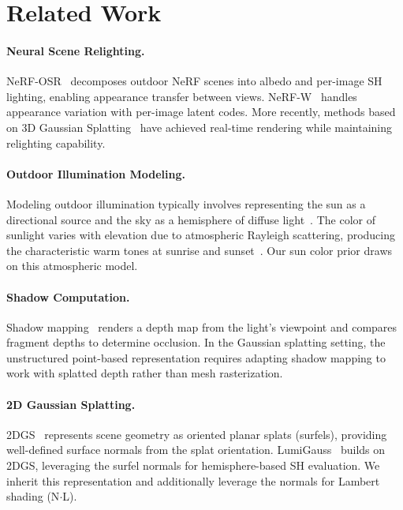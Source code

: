 \section{Related Work}
\label{sec:related}

\paragraph{Neural Scene Relighting.}
\todo{}
NeRF-OSR~\cite{rudnev2022nerfOSR} decomposes outdoor NeRF scenes into albedo and per-image SH lighting, enabling appearance transfer between views.
NeRF-W~\cite{martinbrualla2021nerfw} handles appearance variation with per-image latent codes.
More recently, methods based on 3D Gaussian Splatting~\cite{kerbl20233dgs} have achieved real-time rendering while maintaining relighting capability.

\paragraph{Outdoor Illumination Modeling.}
\todo{}Modeling outdoor illumination typically involves representing the sun as a directional source and the sky as a hemisphere of diffuse light~\cite{lalonde2012estimating,hold-geoffroy2019deep}.
The color of sunlight varies with elevation due to atmospheric Rayleigh scattering, producing the characteristic warm tones at sunrise and sunset~\cite{preetham1999practical,nishita1993display}.
Our sun color prior draws on this atmospheric model.

\paragraph{Shadow Computation.}
\todo{}Shadow mapping~\cite{williams1978casting} renders a depth map from the light's viewpoint and compares fragment depths to determine occlusion.
In the Gaussian splatting setting, the unstructured point-based representation requires adapting shadow mapping to work with splatted depth rather than mesh rasterization.

\paragraph{2D Gaussian Splatting.}
\todo{}2DGS~\cite{huang20242dgs} represents scene geometry as oriented planar splats (surfels), providing well-defined surface normals from the splat orientation.
LumiGauss~\cite{joaxkal2024lumigauss} builds on 2DGS, leveraging the surfel normals for hemisphere-based SH evaluation.
We inherit this representation and additionally leverage the normals for Lambert shading (N$\cdot$L).